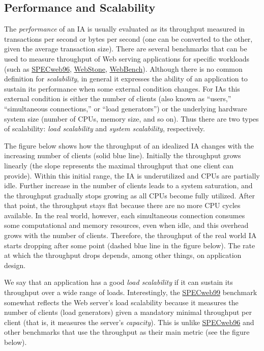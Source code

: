 \documentclass[a4paper,12pt,notitlepage,twoside,openright]{article}
\begin{document}
\protect\hypertarget{PS}{}{}

\hypertarget{performance-and-scalability}{%
\subsection{Performance and
Scalability}\label{performance-and-scalability}}

The \emph{performance} of an IA is usually evaluated as its throughput
measured in transactions per second or bytes per second (one can be
converted to the other, given the average transaction size). There are
several benchmarks that can be used to measure throughput of Web serving
applications for specific workloads (such as
\href{http://www.spec.org/osg/web96/}{SPECweb96},
\href{http://www.mindcraft.com/webstone/}{WebStone},
\href{http://www.zdnet.com/zdbop/webbench/}{WebBench}). Although there
is no common definition for \emph{scalability}, in general it expresses
the ability of an application to sustain its performance when some
external condition changes. For IAs this external condition is either
the number of clients (also known as ``users,'' ``simultaneous
connections,'' or ``load generators'') or the underlying hardware system
size (number of CPUs, memory size, and so on). Thus there are two types
of scalability: \emph{load scalability} and \emph{system scalability},
respectively.

The figure below shows how the throughput of an idealized IA changes
with the increasing number of clients (solid blue line). Initially the
throughput grows linearly (the slope represents the maximal throughput
that one client can provide). Within this initial range, the IA is
underutilized and CPUs are partially idle. Further increase in the
number of clients leads to a system saturation, and the throughput
gradually stops growing as all CPUs become fully utilized. After that
point, the throughput stays flat because there are no more CPU cycles
available. In the real world, however, each simultaneous connection
consumes some computational and memory resources, even when idle, and
this overhead grows with the number of clients. Therefore, the
throughput of the real world IA starts dropping after some point (dashed
blue line in the figure below). The rate at which the throughput drops
depends, among other things, on application design.

We say that an application has a good \emph{load scalability} if it can
sustain its throughput over a wide range of loads. Interestingly, the
\href{http://www.spec.org/osg/web99/}{SPECweb99} benchmark somewhat
reflects the Web server's load scalability because it measures the
number of clients (load generators) given a mandatory minimal throughput
per client (that is, it measures the server's \emph{capacity}). This is
unlike \href{http://www.spec.org/osg/web96/}{SPECweb96} and other
benchmarks that use the throughput as their main metric (see the figure
below).
\end{document}
